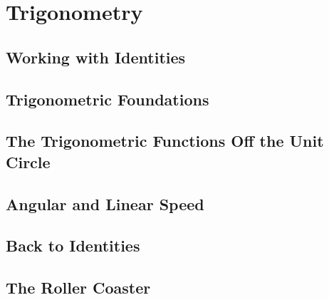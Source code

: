 \documentclass[../precalc.tex]{subfiles}
\begin{document}
\chapter{Trigonometry}
\section{Working with Identities}
\section{Trigonometric Foundations}
\section{The Trigonometric Functions Off the Unit Circle}
\section{Angular and Linear Speed}
\section{Back to Identities}
\section{The Roller Coaster}
\end{document}
